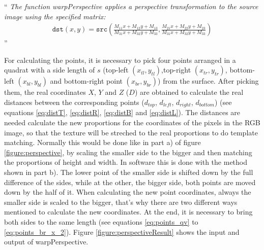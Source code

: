 ``\textit{
The function warpPerspective applies a perspective transformation to the source image using the specified matrix:
\begin{gather}
\texttt{dst} (x,y) = \texttt{src} \left ( \frac{M_{11} x + M_{12} y + M_{13}}{M_{31} x + M_{32} y + M_{33}} , \frac{M_{21} x + M_{22} y + M_{23}}{M_{31} x + M_{32} y + M_{33}} \right ) 
\end{gather}
}''
\cite{willowgarage:opencv:warpPerspective} 

For calculating the points, it is necessary to pick four points arranged in a quadrat with a side length of $s$
(top-left $(x_{tl},y_{tl})$,top-right $(x_{tr},y_{tr})$, bottom-left $(x_{bl},y_{bl})$  and bottom-right point $(x_{br},y_{br})$) 
from the surface. 
After picking them, the real coordinates $X$, $Y$ and $Z$ ($D$) are obtained to calculate 
the real distances between the corresponding points ($d_{top}$, $d_{left}$, $d_{right}$, $d_{bottom}$)
(see equations \ref{eq:distT}, \ref{eq:distR}, \ref{eq:distB} and \vref{eq:distL}).
The distances are needed calculate the new proportions for the coordinates of the pixels in the RGB image, so that
the texture will be streched to the real proportions to do template matching. Normally this would be done like in
part a) of figure \vref{figure:perspective}, by scaling the smaller side to the bigger and then matching the proportions
of height and width. In software this is done with the method shown in part b). 
The lower point of the smaller side is shifted down by the full difference of the sides, while at the other, 
the bigger side, both points are moved down by the half of it. When calculating the new point coordinates,
always the smaller side is scaled to the bigger, that's why there are two different ways mentioned to 
calculate the new coordinates. At the end, it is necessary to bring both sides to the same length
(see equations \ref{eq:points_qv} to \vref{eq:points_br_x_2}). Figure \vref{figure:perspectiveResult}
shows the input and output of warpPerspective. 




